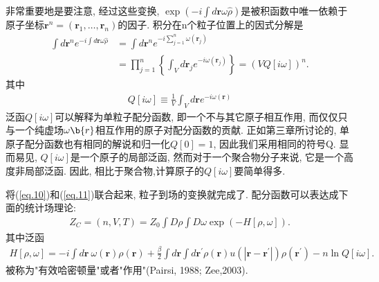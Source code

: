 \par
非常重要地是要注意, 经过这些变换,
$\exp(-i\int d\bm{r} \omega
\hat{\rho})$是被积函数中唯一依赖于原子坐标$\bm{r}^n=(\bm{r}_1,\ldots,\bm{r}_n)$的因子.
积分在n个粒子位置上的因式分解是
\label{subsec.equations}
   \begin{equation}
       \begin{aligned}
           \int d\bm{r}^n e^{-i\int d\bm{r} \omega \hat{\rho}}&=\int d\bm{r}^n
           e^{-i\sum_{j=1}^n \omega(\bm{r}_j)}
           \\&=\prod_{j=1}^n \left\{ \int_V d\bm{r}_j e^{-i\omega(\bm{r}_j)}
           \right\}=(VQ[i\omega])^n.
    \end{aligned}
       \label{eq.11}
    \end{equation}
其中
\label{subsec.equations}
   \begin{equation}
       \begin{aligned}
           Q[i\omega]\equiv \frac{1}{V}\int_V d\bm{r} e^{-i\omega(\bm{r})}
    \end{aligned}
       \label{eq.12}
    \end{equation}
泛函$Q[i\omega]$可以解释为单粒子配分函数,
即一个不与其它原子相互作用,
而仅仅只与一个纯虚场$\omega{\b{r}}$相互作用的原子对配分函数的贡献.
正如第三章所讨论的, 单原子配分函数也有相同的解说和归一化$Q[0]=1$, 
因此我们采用相同的符号Q. 显而易见, $Q[i\omega]$是一个原子的局部泛函,
然而对于一个聚合物分子来说, 它是一个高度非局部泛函. 因此,
相比于聚合物,计算原子的$Q[i\omega]$要简单得多.
\par
将(\ref{eq.10})和(\ref{eq.11})联合起来, 粒子到场的变换就完成了.
配分函数可以表达成下面的统计场理论:
\label{subsec.equations}
   \begin{equation}
       \begin{aligned}
          Z_C=(n, V, T)=Z_0\int D\rho \int D\omega \exp(-H[\rho, \omega]).
    \end{aligned}
       \label{eq.13}
    \end{equation}
其中泛函
\label{subsec.equations}
   \begin{equation}
       \begin{aligned}
           H[\rho, \omega]=-i\int d\bm{r}\ 
           \omega(\bm{r})\rho(\bm{r})+\frac{\beta}{2}\int d\bm{r} \int
           d\bm{r^{'}} \rho(\bm{r})u(|\bm{r}-\bm{r^{'}}|)\rho(\bm{r^{'}})-n\ln
           Q[i\omega].
    \end{aligned}
       \label{eq.14}
    \end{equation}
被称为"有效哈密顿量"或者"作用"(Pairsi, 1988; Zee,2003).
